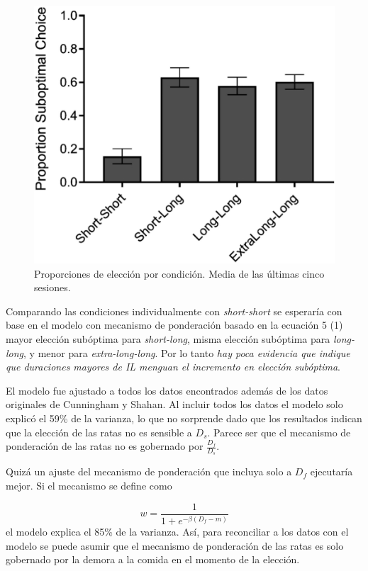 \documentclass[a4paper,12pt]{article}
\begin{document}
\begin{figure}[ht]
	\begin{center}
		\includegraphics[scale=0.4]{Cunningham2020(2).png}
		\caption{Proporciones de elección por condición. Media de las últimas cinco sesiones.}
	\end{center}
\end{figure}

Comparando las condiciones individualmente con {\itshape short-short} se esperaría con base en el modelo con mecanismo de ponderación basado en la ecuación 5 (1) mayor elección subóptima para {\itshape short-long}, misma elección subóptima para {\itshape long-long}, y menor para {\itshape extra-long-long}. Por lo tanto {\itshape hay poca evidencia que indique que duraciones mayores de IL menguan el incremento en elección subóptima}.

El modelo fue ajustado a todos los datos encontrados además de los datos originales de Cunningham y Shahan. Al incluir todos los datos el modelo solo explicó el 59\% de la varianza, lo que no sorprende dado que los resultados indican que la elección de las ratas no es sensible a $D_{s}$. Parece ser que el mecanismo de ponderación de las ratas no es gobernado por $\frac{D_{f}}{D_{s}}$. 

Quizá un ajuste del mecanismo de ponderación que incluya solo a $D_{f}$ ejecutaría mejor. Si el mecanismo se define como 

\begin{equation}
	w = 
	\frac{
		1
	}{
		1 + e^{
			-\beta(D_{f} - m)
		}
	}
\end{equation}
el modelo explica el 85\% de la varianza. Así, para reconciliar a los datos con el modelo se puede asumir que el mecanismo de ponderación de las ratas es solo gobernado por la demora a la comida en el momento de la elección.
\end{document}
